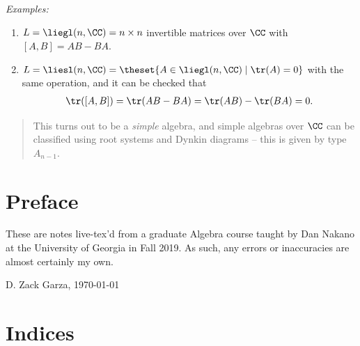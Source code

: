 \emph{Examples:}

\begin{enumerate}
\def\labelenumi{\arabic{enumi}.}
\item
  \(L = \liegl(n, \CC) = n \times n\) invertible matrices over \(\CC\)
  with \([A, B] = AB - BA\).
\item
  \(L = \liesl(n, \CC) = \theset{A \in \liegl(n, \CC) \mid \tr(A) = 0}\)
  with the same operation, and it can be checked that
  \begin{align*}
  \tr([A, B]) = \tr(AB - BA) = \tr(AB) - \tr(BA) = 0
  .\end{align*}
\end{enumerate}

\begin{quote}
This turns out to be a \emph{simple} algebra, and simple algebras over
\(\CC\) can be classified using root systems and Dynkin diagrams -- this
is given by type \(A_{n-1}\).
\end{quote}

\hypertarget{preface}{%
\section{Preface}\label{preface}}

These are notes live-tex'd from a graduate Algebra course taught by Dan
Nakano at the University of Georgia in Fall 2019. As such, any errors or
inaccuracies are almost certainly my own.

\medskip
\begin{flushright}
  D. Zack Garza, \today \\
  \currenttime
\end{flushright}

\newpage

\newpage
\section{Indices}

\renewcommand{\listtheoremname}{Definitions}
\listoftheorems[ignoreall,show={definition}, numwidth=3.5em]

\renewcommand{\listtheoremname}{Theorems}
\listoftheorems[ignoreall,show={theorem,proposition}, numwidth=3.5em]

\renewcommand{\listtheoremname}{Exercises}
\listoftheorems[ignoreall,show={exercise}, numwidth=3.5em]

\listoffigures


\printbibliography[title=Bibliography]



